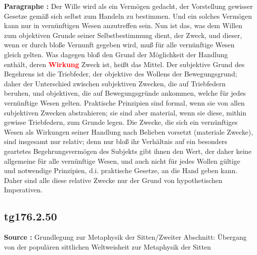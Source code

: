 \documentclass[a4paper,12pt,twoside]{book}
\newcommand{\match}[1]{\textcolor{red}{\textbf{#1}}}
\begin{document}
	\noindent\textbf{Paragraphe : }Der Wille wird als ein Vermögen gedacht, der Vorstellung gewisser Gesetze gemäß sich selbst zum Handeln zu bestimmen. Und ein solches Vermögen kann nur in vernünftigen Wesen anzutreffen sein. Nun ist das, was dem Willen zum objektiven Grunde seiner Selbstbestimmung dient, der Zweck, und dieser, wenn er durch bloße Vernunft gegeben wird, muß für alle vernünftige Wesen gleich gelten. Was dagegen bloß den Grund der Möglichkeit der Handlung enthält, deren \match{Wirkung} Zweck ist, heißt das Mittel. Der subjektive Grund des Begehrens ist die Triebfeder, der objektive des Wollens der Bewegungsgrund; daher der Unterschied zwischen subjektiven Zwecken, die auf Triebfedern beruhen, und objektiven, die auf Bewegungsgründe ankommen, welche für jedes vernünftige Wesen gelten. Praktische Prinzipien sind formal, wenn sie von allen subjektiven Zwecken abstrahieren; sie sind aber material, wenn sie diese, mithin gewisse Triebfedern, zum Grunde legen. Die Zwecke, die sich ein vernünftiges Wesen als Wirkungen seiner Handlung nach Belieben vorsetzt (materiale Zwecke), sind insgesamt nur relativ; denn nur bloß ihr Verhältnis auf ein besonders geartetes Begehrungsvermögen des Subjekts gibt ihnen den Wert, der daher keine allgemeine für alle vernünftige Wesen, und auch nicht für jedes Wollen gültige und notwendige Prinzipien, d.i. praktische Gesetze, an die Hand geben kann. Daher sind alle diese relative Zwecke nur der Grund von hypothetischen Imperativen. 
	
	\subsection*{tg176.2.50} 
	\textbf{Source : }Grundlegung zur Metaphysik der Sitten/Zweiter Abschnitt: Übergang von der populären sittlichen Weltweisheit zur Metaphysik der Sitten\\  
	
\end{document}
